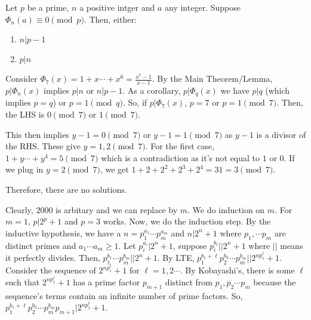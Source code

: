 \documentclass[11pt]{article}
\begin{document}

\begin{sol}
\begin{lemma}[Lemma 1]
Let $p$ be a prime, $n$ a positive intger and $a$ any integer. Suppose $\Phi_{n}(a)\equiv 0\pmod{p}$. Then, either:
\begin{enumerate}
\item $n|p-1$
\item $p|n$
\end{enumerate}
\end{lemma}

Consider $\Phi_{7}(x)=1+x\cdots +x^{6}=\frac{x^7-1}{x-1}$. By the Main Theorem/Lemma, $p|\Phi_{n}(x)$ implies $p|n$ or $n|p-1$. As a corollary, $p|\Phi_{q}(x)$ we have $p|q$ (which implies $p=q$) or $p=1\pmod{q}$. So, if $p|\Phi_{7}(x)$, $p=7$ or $p=1\pmod{7}$. Then, the LHS is $0\pmod{7}$ or $1\pmod{7}$.

This then implies $y-1=0\pmod{7}$ or $y-1=1\pmod{7}$ as $y-1$ is a divisor of the RHS. These give $y=1,2\pmod{7}$. For the first case, $1+y\cdots+y^4=5\pmod{7}$ which is a contradiction as it's not equal to $1$ or $0$. If we plug in $y=2\pmod{7}$, we get $1+2+2^2+2^3+2^4=31=3\pmod{7}$. 

Therefore, there are no solutions.
\end{sol}



\begin{sol}
Clearly, $2000$ is arbitary and we can replace by $m$. We do induction on $m$. For $m=1$, $p|2^{p}+1$ and $p=3$ works.  Now, we do the induction step. By the inductive hypothesis, we have a $n=p_{1}^{a_{1}}\cdots p_{m}^{a_{m}}$ and $n|2^{n}+1$ where $p_{1},\cdots p_{m}$ are distinct primes and $a_{1}\cdots a_{m}\ge 1$. Let $p_{i}^{a_{i}}|2^{n}+1$, suppose $p_{i}^{b_{i}}||2^{n}+1$ where $||$ means it perfectly divides. Then, $p_{1}^{b_{1}}\cdots p_{m}^{b_{m}}||2^{n}+1$. By LTE, $p_{1}^{b_{1}+\ell}p_{2}^{b_{2}}\cdots p_{m}^{b_{m}}||2^{np_{1}^{\ell}}+1$. Consider the sequence of $2^{np_{1}^{\ell}}+1$ for $\ell = 1,2\cdots$. By Kobayashi's, there is some $\ell$ such that $2^{np_{1}^{\ell}}+1$ has a prime factor $p_{m+1}$ distinct from $p_{1},p_{2}\cdots p_{m}$ because the sequence's terms contain an infinite number of prime factors. So, $p_{1}^{b_{1}+\ell}p_{2}^{b_{2}}\cdots p_{m}^{b_{m}}p_{m+1}|2^{np_{1}^{\ell}}+1$.
\end{sol}
\end{document}
